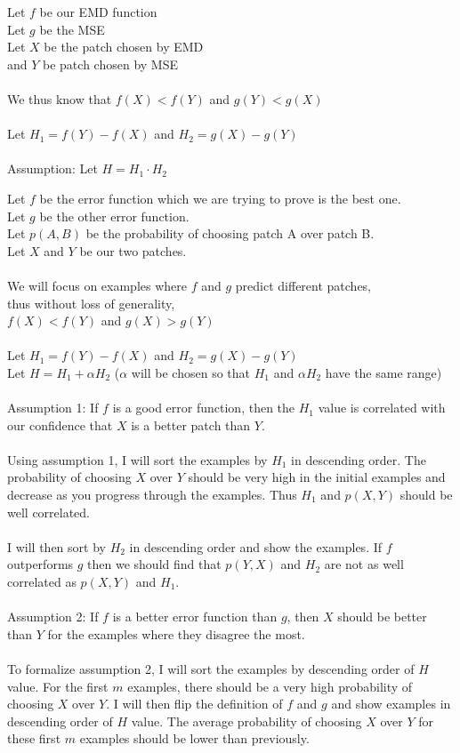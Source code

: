 \documentclass[12pt,psfig]{article}
\begin{document}
\setlength{\parskip}{1.2ex plus0.3ex minus 0.3ex}


\thispagestyle{empty} \pagestyle{myheadings} 

Let $f$ be our EMD function\\
Let $g$ be the MSE\\
Let $X$ be the patch chosen by EMD \\
and $Y$ be patch chosen by MSE\\
\\
We thus know that $f(X)<f(Y)$ and $g(Y)<g(X)$\\
\\
Let $H_1=f(Y)-f(X)$ and $H_2=g(X)-g(Y)$\\
\\
Assumption: 
Let $H=H_1 \cdot H_2$

\newpage

Let $f$ be the error function which we are trying to prove is the best one.\\
Let $g$ be the other error function.\\
Let $p(A,B)$ be the probability of choosing patch A over patch B.\\
Let $X$ and $Y$ be our two patches.\\
\\
We will focus on examples where $f$ and $g$ predict different patches, \\
thus without loss of generality,\\
$f(X) < f(Y)$ and $g(X) > g(Y)$\\
\\
Let $H_1 = f(Y)-f(X)$ and $H_2 = g(X)-g(Y)$\\
Let $H = H_1 + \alpha H_2$ ($\alpha$ will be chosen so that $H_1$ and $\alpha H_2$ have the same range)\\
\\
Assumption 1: If $f$ is a good error function, then the $H_1$ value is correlated with our confidence that $X$ is a better patch than $Y$.\\
\\
Using assumption 1, I will sort the examples by $H_1$ in descending order. The probability of choosing $X$ over $Y$ should be very high in the initial examples and decrease as you progress through the examples. Thus $H_1$ and $p(X,Y)$ should be well correlated.\\
\\
I will then sort by $H_2$ in descending order and show the examples. If $f$ outperforms $g$ then we should find that $p(Y,X)$ and $H_2$ are not as well correlated as $p(X,Y)$ and $H_1$.  \\
\\
Assumption 2: If $f$ is a better error function than $g$, then $X$ should be better than $Y$ for the examples where they disagree the most.\\
\\
To formalize assumption 2, I will sort the examples by descending order of $H$ value. For the first $m$ examples, there should be a very high probability of choosing $X$ over $Y$. I will then flip the definition of $f$ and $g$ and show examples in descending order of $H$ value. The average probability of choosing $X$ over $Y$ for these first $m$ examples should be lower than previously.
\end{document}
